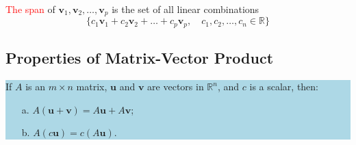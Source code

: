 \documentclass{article}
\begin{document}
    \textcolor{red}{The span} of \(\mathbf{v}_1, \mathbf{v}_2, \ldots, \mathbf{v}_p\) is the set of all linear combinations
    \[
    \{ c_1\mathbf{v}_1 + c_2\mathbf{v}_2 + \dots + c_p\mathbf{v}_p, \quad c_1, c_2, \ldots, c_n \in \mathbb{R} \}
    \]

\subsection{Properties of Matrix-Vector Product}
    \vspace{1cm}
    \begin{center}
    \colorbox{lightblue}{\parbox{0.9\textwidth}{
    If \(A\) is an \(m \times n\) matrix, \(\mathbf{u}\) and \(\mathbf{v}\) are vectors in \(\mathbb{R}^n\), and \(c\) is a scalar, then:
    \begin{enumerate}
        \item[a.] \(A(\mathbf{u} + \mathbf{v}) = A\mathbf{u} + A\mathbf{v}\);
        \item[b.] \(A(c\mathbf{u}) = c(A\mathbf{u})\).
    \end{enumerate}
    }}
    \end{center}
\end{document}
